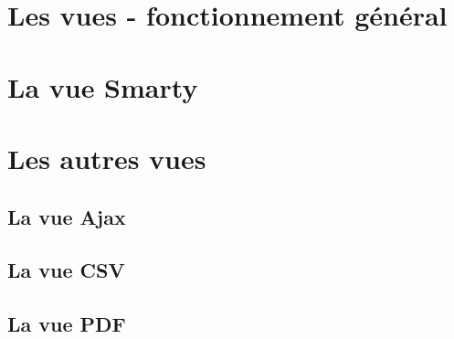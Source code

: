 \chapter{Les vues - fonctionnement général}\label{vue}

\chapter{La vue Smarty}\label{smarty}

\chapter{Les autres vues}
\section{La vue Ajax}
\section{La vue CSV}
\section{La vue PDF}
